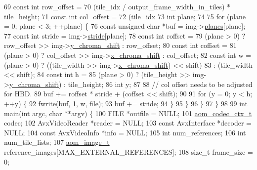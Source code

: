 \begin{DoxyCodeInclude}
{69     \textcolor{keyword}{const} \textcolor{keywordtype}{int} row\_offset =
70         (tile\_idx / output\_frame\_width\_in\_tiles) * tile\_height;
71     \textcolor{keyword}{const} \textcolor{keywordtype}{int} col\_offset =
72         (tile\_idx %
73     \textcolor{keywordtype}{int} plane;
74 
75     \textcolor{keywordflow}{for} (plane = 0; plane < 3; ++plane) \{
76       \textcolor{keyword}{const} \textcolor{keywordtype}{unsigned} \textcolor{keywordtype}{char} *buf = img->\hyperlink{structaom__image_ac54dbc5237ca2914f9ec30105dfbe302}{planes}[plane];
77       \textcolor{keyword}{const} \textcolor{keywordtype}{int} stride = img->\hyperlink{structaom__image_a6dc693d7dbc9eb06c0cdde307ca58372}{stride}[plane];
78       \textcolor{keyword}{const} \textcolor{keywordtype}{int} roffset =
79           (plane > 0) ? row\_offset >> img->\hyperlink{structaom__image_a5acfc850c272e1377f3b7d58a95f3749}{y\_chroma\_shift} : row\_offset;
80       \textcolor{keyword}{const} \textcolor{keywordtype}{int} coffset =
81           (plane > 0) ? col\_offset >> img->\hyperlink{structaom__image_a83fdb3677275dc0e1e38701000447214}{x\_chroma\_shift} : col\_offset;
82       \textcolor{keyword}{const} \textcolor{keywordtype}{int} w = (plane > 0) ? ((tile\_width >> img->\hyperlink{structaom__image_a83fdb3677275dc0e1e38701000447214}{x\_chroma\_shift}) << shift)
83                                 : (tile\_width << shift);
84       \textcolor{keyword}{const} \textcolor{keywordtype}{int} h =
85           (plane > 0) ? (tile\_height >> img->\hyperlink{structaom__image_a5acfc850c272e1377f3b7d58a95f3749}{y\_chroma\_shift}) : tile\_height;
86       \textcolor{keywordtype}{int} y;
87 
88       \textcolor{comment}{// col offset needs to be adjusted for HBD.}
89       buf += roffset * stride + (coffset << shift);
90 
91       \textcolor{keywordflow}{for} (y = 0; y < h; ++y) \{
92         fwrite(buf, 1, w, file);
93         buf += stride;
94       \}
95     \}
96   \}
97 \}
98 
99 \textcolor{keywordtype}{int} main(\textcolor{keywordtype}{int} argc, \textcolor{keywordtype}{char} **argv) \{
100   FILE *outfile = NULL;
101   \hyperlink{structaom__codec__ctx}{aom\_codec\_ctx\_t} codec;
102   AvxVideoReader *reader = NULL;
103   \textcolor{keyword}{const} AvxInterface *decoder = NULL;
104   \textcolor{keyword}{const} AvxVideoInfo *info = NULL;
105   \textcolor{keywordtype}{int} num\_references;
106   \textcolor{keywordtype}{int} num\_tile\_lists;
107   \hyperlink{structaom__image}{aom\_image\_t} reference\_images[MAX\_EXTERNAL\_REFERENCES];
108   \textcolor{keywordtype}{size\_t} frame\_size = 0;
}
\end{DoxyCodeInclude}
